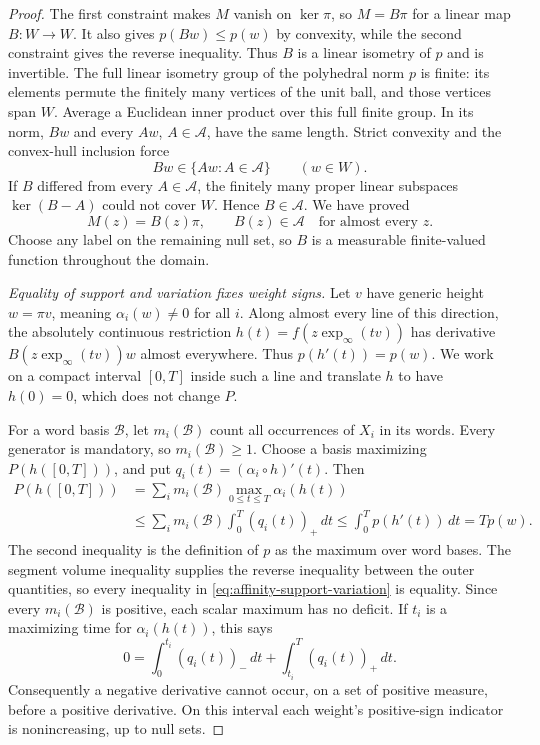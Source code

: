 \begin{proof}
The first constraint makes $M$ vanish on $\ker\pi$, so $M=B\pi$
for a linear map $B:W\to W$.  It also gives
$p(Bw)\le p(w)$ by convexity, while the second constraint gives the
reverse inequality.  Thus $B$ is a linear isometry of $p$ and is
invertible.  The full linear isometry group of the polyhedral norm
$p$ is finite: its elements permute the finitely many vertices of
the unit ball, and those vertices span $W$.  Average a Euclidean
inner product over this full finite group.  In its norm, $Bw$ and
every $Aw$, $A\in\mathcal A$, have the same length.  Strict
convexity and the convex-hull inclusion force
\[
 Bw\in\{Aw:A\in\mathcal A\}\qquad(w\in W).
\]
If $B$ differed from every $A\in\mathcal A$, the finitely many
proper linear subspaces $\ker(B-A)$ could not cover $W$.  Hence
$B\in\mathcal A$.  We have proved
\begin{equation}\label{eq:affinity-label-field}
 M(z)=B(z)\pi,\qquad B(z)\in\mathcal A
 \quad\text{for almost every }z.
\end{equation}
Choose any label on the remaining null set, so $B$ is a measurable
finite-valued function throughout the domain.

\emph{Equality of support and variation fixes weight signs.}
Let $v$ have generic height $w=\pi v$, meaning
$\alpha_i(w)\ne0$ for all $i$.  Along almost every line of this
direction, the absolutely continuous restriction
$h(t)=f(z\exp_\infty(tv))$ has derivative $B(z\exp_\infty(tv))w$
almost everywhere.  Thus $p(h'(t))=p(w)$.  We work on a compact
interval $[0,T]$ inside such a line and translate $h$ to have
$h(0)=0$, which does not change $P$.

For a word basis $\mathcal B$, let $m_i(\mathcal B)$ count all
occurrences of $X_i$ in its words.  Every generator is mandatory,
so $m_i(\mathcal B)\ge1$.  Choose a basis maximizing
$P(h([0,T]))$, and put $q_i(t)=(\alpha_i\circ h)'(t)$.  Then
\begin{align}
 P(h([0,T]))
 &=\sum_i m_i(\mathcal B)\max_{0\le t\le T}\alpha_i(h(t))
 \nonumber\\
 &\le\sum_i m_i(\mathcal B)\int_0^T(q_i(t))_+\,dt
 \le\int_0^T p(h'(t))\,dt
 =T p(w).
 \label{eq:affinity-support-variation}
\end{align}
The second inequality is the definition of $p$ as the maximum over
word bases.  The segment volume inequality supplies the reverse
inequality between the outer quantities, so every inequality in
\eqref{eq:affinity-support-variation} is equality.  Since every
$m_i(\mathcal B)$ is positive, each scalar maximum has no deficit.
If $t_i$ is a maximizing time for $\alpha_i(h(t))$, this says
\begin{equation}\label{eq:affinity-sign-order}
 0=\int_0^{t_i}(q_i(t))_-\,dt
                  +\int_{t_i}^T(q_i(t))_+\,dt.
\end{equation}
Consequently a negative derivative cannot occur, on a set of
positive measure, before a positive derivative.  On this interval
each weight's positive-sign indicator is nonincreasing, up to null
sets.


\end{proof}
